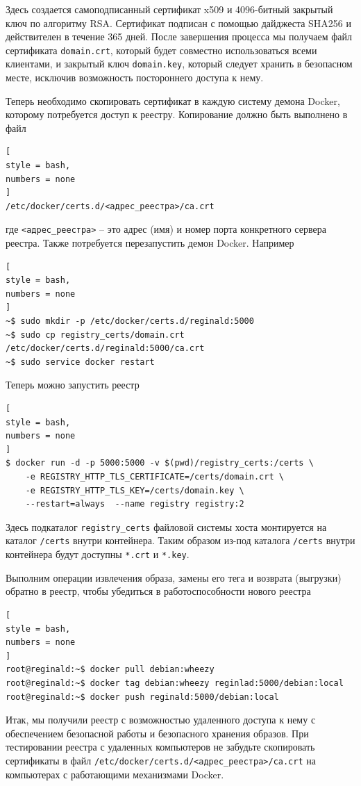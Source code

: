 \documentclass[%
	11pt,
	a4paper,
	utf8,
		]{article}
\begin{document}
Здесь создается самоподписанный сертификат x509 и 4096-битный закрытый ключ по алгоритму RSA. Сертификат подписан с помощью дайджеста SHA256 и действителен в течение 365 дней. После завершения процесса мы получаем файл сертификата \texttt{domain.crt}, который будет совместно использоваться всеми клиентами, и закрытый ключ \texttt{domain.key}, который следует хранить в безопасном месте, исключив возможность постороннего доступа к нему.

Теперь необходимо скопировать сертификат в каждую систему демона Docker, которому потребуется доступ к реестру. Копирование должно быть выполнено в файл
\begin{lstlisting}[
style = bash,
numbers = none
]
/etc/docker/certs.d/<адрес_реестра>/ca.crt
\end{lstlisting}
где \verb|<адрес_реестра>| -- это адрес (имя) и номер порта конкретного сервера реестра. Также потребуется перезапустить демон Docker. Например
\begin{lstlisting}[
style = bash,
numbers = none
]
~$ sudo mkdir -p /etc/docker/certs.d/reginald:5000
~$ sudo cp registry_certs/domain.crt /etc/docker/certs.d/reginald:5000/ca.crt
~$ sudo service docker restart
\end{lstlisting}

Теперь можно запустить реестр
\begin{lstlisting}[
style = bash,
numbers = none
]
$ docker run -d -p 5000:5000 -v $(pwd)/registry_certs:/certs \
    -e REGISTRY_HTTP_TLS_CERTIFICATE=/certs/domain.crt \
    -e REGISTRY_HTTP_TLS_KEY=/certs/domain.key \
    --restart=always  --name registry registry:2
\end{lstlisting}

Здесь подкаталог \texttt{registry\_certs} файловой системы хоста монтируется на каталог \texttt{/certs} внутри контейнера. Таким образом из-под каталога \texttt{/certs} внутри контейнера будут доступны \texttt{*.crt} и \texttt{*.key}.

Выполним операции извлечения образа, замены его тега и возврата (выгрузки) обратно в реестр, чтобы убедиться в работоспособности нового реестра
\begin{lstlisting}[
style = bash,
numbers = none
]
root@reginald:~$ docker pull debian:wheezy
root@reginald:~$ docker tag debian:wheezy reginlad:5000/debian:local
root@reginald:~$ docker push reginald:5000/debian:local
\end{lstlisting}

Итак, мы получили реестр с возможностью удаленного доступа к нему с обеспечением безопасной работы и безопасного хранения образов. При тестировании реестра с удаленных компьютеров не забудьте скопировать сертификаты в файл \texttt{/etc/docker/certs.d/<адрес\_реестра>/ca.crt} на компьютерах с работающими механизмами Docker.
\end{document}
